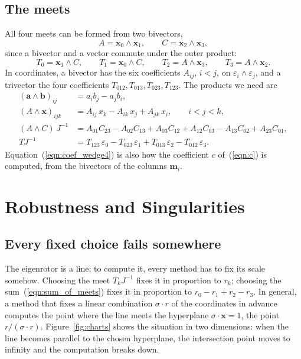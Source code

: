 \documentclass{birkjour}
\theoremstyle{definition}
\theoremstyle{remark}
\numberwithin{equation}{section}
\begin{document}
\subsection{The meets}

All four meets can be formed from two bivectors,
\begin{equation}
\label{eqn:bivectors}
A = \mathbf x_0 \wedge \mathbf x_1, \qquad C = \mathbf x_2 \wedge \mathbf x_3,
\end{equation}
since a bivector and a vector commute under the outer product:
\begin{equation}
\label{eqn:trivectors_AC}
T_0 = \mathbf x_1 \wedge C, \qquad T_1 = \mathbf x_0 \wedge C, \qquad T_2 = A \wedge \mathbf x_3, \qquad T_3 = A \wedge \mathbf x_2.
\end{equation}
In coordinates, a bivector has the six coefficients $A_{ij}$, $i < j$, on $\varepsilon_i \wedge \varepsilon_j$, and a trivector the four coefficients $T_{012}, T_{013}, T_{023}, T_{123}$. The products we need are
\begin{align}
(\mathbf a \wedge \mathbf b)_{ij} &= a_i b_j - a_j b_i, \label{eqn:coef_wedge2} \\
(A \wedge \mathbf x)_{ijk} &= A_{ij}\, x_k - A_{ik}\, x_j + A_{jk}\, x_i, \qquad i < j < k, \label{eqn:coef_wedge3} \\
(A \wedge C)\, J^{-1} &= A_{01} C_{23} - A_{02} C_{13} + A_{03} C_{12} + A_{12} C_{03} - A_{13} C_{02} + A_{23} C_{01}, \label{eqn:coef_wedge4} \\
T J^{-1} &= T_{123}\, \varepsilon_0 - T_{023}\, \varepsilon_1 + T_{013}\, \varepsilon_2 - T_{012}\, \varepsilon_3. \label{eqn:coef_dual}
\end{align}
Equation~(\ref{eqn:coef_wedge4}) is also how the coefficient $c$ of~(\ref{eqn:c}) is computed, from the bivectors of the columns $\mathbf m_i$.

\section{Robustness and Singularities}
\label{section:robustness}

\subsection{Every fixed choice fails somewhere}

The eigenrotor is a line; to compute it, every method has to fix its scale somehow. Choosing the meet $T_k J^{-1}$ fixes it in proportion to $r_k$; choosing the sum~(\ref{eqn:sum_of_meets}) fixes it in proportion to $r_0 - r_1 + r_2 - r_3$. In general, a method that fixes a linear combination $\sigma \cdot r$ of the coordinates in advance computes the point where the line meets the hyperplane $\sigma \cdot \mathbf x = 1$, the point $r / (\sigma \cdot r)$. Figure~\ref{fig:charts} shows the situation in two dimensions: when the line becomes parallel to the chosen hyperplane, the intersection point moves to infinity and the computation breaks down.
\end{document}
